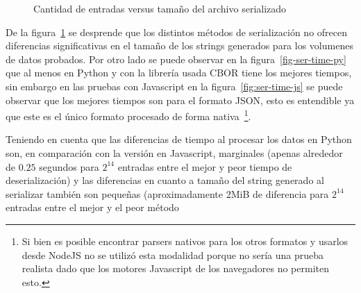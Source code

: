\begin{figure}
    \centering
    \begin{framed}
    \end{framed}
    \caption{Cantidad de entradas versus tamaño del archivo serializado}
    \label{fig:ser-size}
\end{figure}

De la figura~\ref{fig:ser-size} se desprende que los distintos métodos de
serialización no ofrecen diferencias significativas en el tamaño de los
strings generados para los volumenes de datos probados. Por otro lado
se puede observar en la figura~\ref{fig-ser-time-py} que al menos en
Python y con la librería usada CBOR tiene los mejores tiempos, sin
embargo en las pruebas con Javascript en la figura~\ref{fig:ser-time-js}
se puede observar que los mejores tiempos son para el formato JSON,
esto es entendible ya que este es el único formato procesado de forma
nativa~\footnote{Si bien es posible encontrar parsers nativos para los
otros formatos y usarlos desde NodeJS no se utilizó esta modalidad porque
no sería una prueba realista dado que los motores Javascript de los
navegadores no permiten esto.}.

Teniendo en cuenta que las diferencias de tiempo al procesar los datos
en Python son, en comparación con la versión en Javascript, marginales
(apenas alrededor de $0.25$ segundos para $2^{14}$
entradas entre el mejor y peor tiempo de deserialización) y las diferencias
en cuanto a tamaño del string generado al
serializar también son pequeñas (aproximadamente 2MiB de diferencia para
$2^{14}$ entradas entre el mejor y el peor método
